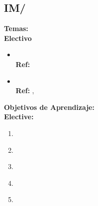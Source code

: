 \subsection{IM/\IMDistributedDatabases}\label{sec:BOK:IMDistributedDatabases}
\noindent \textbf{Temas:}\\
\noindent \textbf{Electivo}
\begin{itemize}
	\item \IMDistributedDatabasesTopicDistributed\xspace \\ \textbf{Ref:} \label{sec:BOK:IMDistributedDatabasesTopicDistributed}
	\item \IMDistributedDatabasesTopicParallel\xspace \\ \textbf{Ref:} , \label{sec:BOK:IMDistributedDatabasesTopicParallel}
\end{itemize}


\noindent \textbf{Objetivos de Aprendizaje:}\\
\noindent \textbf{Elective:}
\begin{enumerate}
	\setcounter{enumi}{0}
	\item \IMDistributedDatabasesLOExplainTheFor\xspace[\IMDistributedDatabasesLOExplainTheForLevel]\label{sec:BOK:IMDistributedDatabasesLOExplainTheFor}
	\item \IMDistributedDatabasesLOEvaluateSimple\xspace[\IMDistributedDatabasesLOEvaluateSimpleLevel]\label{sec:BOK:IMDistributedDatabasesLOEvaluateSimple}
	\item \IMDistributedDatabasesLOExplainHowPhase\xspace[\IMDistributedDatabasesLOExplainHowPhaseLevel]\label{sec:BOK:IMDistributedDatabasesLOExplainHowPhase}
	\item \IMDistributedDatabasesLODescribeDistributed\xspace[\IMDistributedDatabasesLODescribeDistributedLevel]\label{sec:BOK:IMDistributedDatabasesLODescribeDistributed}
	\item \IMDistributedDatabasesLODescribeTheOfThe\xspace[\IMDistributedDatabasesLODescribeTheOfTheLevel]\label{sec:BOK:IMDistributedDatabasesLODescribeTheOfThe}
\end{enumerate}


